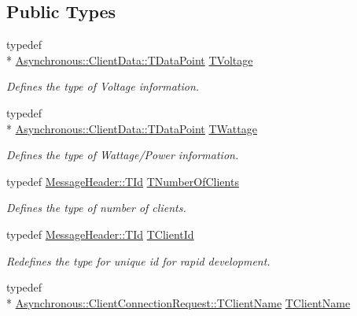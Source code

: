 \subsection*{Public Types}
\begin{DoxyCompactItemize}
\item 
typedef \\*
\hyperlink{class_terra_swarm_1_1_asynchronous_1_1_client_data_ac733720fed15e940f991de44f1bb514e}{Asynchronous\-::\-Client\-Data\-::\-T\-Data\-Point} \hyperlink{class_control_manager_a336440023399b9165c117020f6b14ec3}{T\-Voltage}
\begin{DoxyCompactList}\small\item\em Defines the type of Voltage information. \end{DoxyCompactList}\item 
typedef \\*
\hyperlink{class_terra_swarm_1_1_asynchronous_1_1_client_data_ac733720fed15e940f991de44f1bb514e}{Asynchronous\-::\-Client\-Data\-::\-T\-Data\-Point} \hyperlink{class_control_manager_a24609feed8b0443df450b070194df20a}{T\-Wattage}
\begin{DoxyCompactList}\small\item\em Defines the type of Wattage/\-Power information. \end{DoxyCompactList}\item 
typedef \hyperlink{class_terra_swarm_1_1_message_header_ab55de822fadad758edcd8f36bd07676e}{Message\-Header\-::\-T\-Id} \hyperlink{class_control_manager_a7eefb0a4e9d10e65771939912d650bcc}{T\-Number\-Of\-Clients}
\begin{DoxyCompactList}\small\item\em Defines the type of number of clients. \end{DoxyCompactList}\item 
typedef \hyperlink{class_terra_swarm_1_1_message_header_ab55de822fadad758edcd8f36bd07676e}{Message\-Header\-::\-T\-Id} \hyperlink{class_control_manager_a1bff13cab35db39c43f81f49b56e4849}{T\-Client\-Id}
\begin{DoxyCompactList}\small\item\em Redefines the type for unique id for rapid development. \end{DoxyCompactList}\item 
typedef \\*
\hyperlink{class_terra_swarm_1_1_asynchronous_1_1_client_connection_request_a50a16fcfef8eb10d5191b6eaf0723a92}{Asynchronous\-::\-Client\-Connection\-Request\-::\-T\-Client\-Name} \hyperlink{class_control_manager_ae9c86c5286c9ebf222ea44b60c463872}{T\-Client\-Name}

\end{DoxyCompactItemize}
